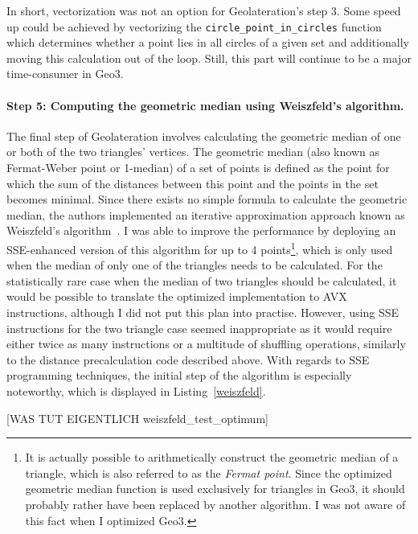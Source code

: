 In short, vectorization was not an option for Geolateration's step 3. Some speed up could be achieved by vectorizing the \texttt{circle\_point\_in\_circles} function which determines whether a point lies in all circles of a given set and additionally moving this calculation out of the loop. Still, this part will continue to be a major time-consumer in Geo3. 

\paragraph{Step 5: Computing the geometric median using Weiszfeld's algorithm.} The final step of Geolateration involves calculating the geometric median of one or both of the two triangles' vertices. The geometric median (also known as Fermat-Weber point or 1-median) of a set of points is defined as the point for which the sum of the distances between this point and the points in the set becomes minimal. Since there exists no simple formula to calculate the geometric median, the authors implemented an iterative approximation approach known as Weiszfeld's algorithm~\cite{weiszfeld2009minimum}. I was able to improve the performance by deploying an SSE-enhanced version of this algorithm for up to 4 points\footnote{It is actually possible to arithmetically construct the geometric median of a triangle, which is also referred to as the \emph{Fermat point}. Since the optimized geometric median function is used exclusively for triangles in Geo3, it should probably rather have been replaced by another algorithm. I was not aware of this fact when I optimized Geo3.}, which is only used when the median of only one of the triangles needs to be calculated. For the statistically rare case when the median of two triangles should be calculated, it would be possible to translate the optimized implementation to AVX instructions, although I did not put this plan into practise. However, using SSE instructions for the two triangle case seemed inappropriate as it would require either twice as many instructions or a multitude of shuffling operations, similarly to the distance precalculation code described above. With regards to SSE programming techniques, the initial step of the algorithm is especially noteworthy, which is displayed in Listing~\ref{weiszfeld}. 

[WAS TUT EIGENTLICH weiszfeld\_test\_optimum] 

